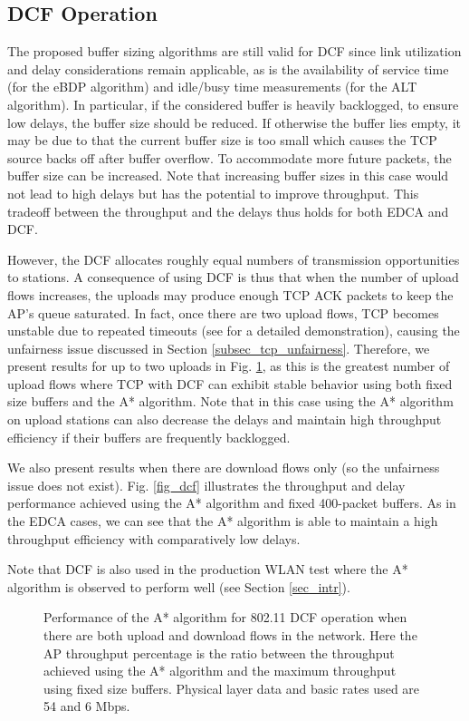 \documentclass[10pt,twocolumn, journal]{IEEEtran}
\begin{document}
\subsection{DCF Operation}

The proposed buffer sizing algorithms are still valid for DCF since link utilization and delay considerations remain applicable, as is the availability of service time (for the eBDP algorithm) and idle/busy time measurements (for the ALT algorithm). In particular, if the considered buffer is heavily backlogged, to ensure low delays, the buffer size should be reduced. If otherwise the buffer lies empty, it may be due to that the current buffer size is too small which causes the TCP source backs off after buffer overflow. To accommodate more future packets, the buffer size can be increased. Note that increasing buffer sizes in this case would not lead to high delays but has the potential to improve throughput. This tradeoff between the throughput and the delays thus holds for both EDCA and DCF.

However, the DCF allocates roughly equal numbers of transmission opportunities to stations.  A consequence of using DCF is thus that when the number of upload flows increases, the uploads may produce enough TCP ACK packets to keep the AP's queue saturated. In fact, once there are two upload flows, TCP becomes unstable due to repeated timeouts (see \cite{David_winmee_2008} for a detailed demonstration), causing the unfairness issue discussed in Section \ref{subsec_tcp_unfairness}. Therefore, we present results for up to two uploads in Fig. \ref{fig_dcfvsastar}, as this is the greatest number of upload flows where TCP with DCF can exhibit stable behavior using both fixed size buffers and the A* algorithm. Note that in this case using the A* algorithm on upload stations can also decrease the delays and maintain high throughput efficiency if their buffers are frequently backlogged.

We also present results when there are download flows only (so the unfairness issue does not exist). Fig. \ref{fig_dcf} illustrates the throughput and delay performance achieved using the A* algorithm and fixed 400-packet buffers. As in the EDCA cases, we can see that the A* algorithm is able to maintain a high throughput efficiency with comparatively low delays.

Note that DCF is also used in the production WLAN test where the A* algorithm is observed to perform well (see Section \ref{sec_intr}).


\begin{figure}[tb]
   \centering
   \caption{Performance of the A* algorithm for 802.11 DCF operation when there are both upload and download flows in the network. Here the AP throughput percentage is the ratio between the throughput achieved using the A* algorithm and the maximum throughput using fixed size buffers. Physical layer data and basic rates used are 54 and 6 Mbps.}
   \label{fig_dcfvsastar}
\end{figure}
\end{document}
